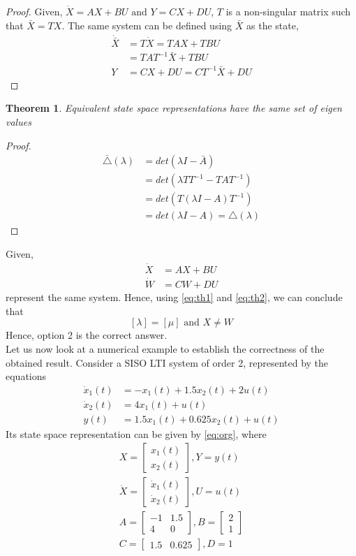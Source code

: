 \documentclass[journal,12pt,twocolumn]{IEEEtran}
\newtheorem{theorem}{Theorem}[section]
\begin{document}
\begin{proof}
Given, $\dot X=AX+BU \text{ and } Y=CX+DU$, $T$ is a non-singular matrix such that $\bar X= TX$. The same system can be defined using $\bar X$ as the state,
\begin{align}
    \dot{\bar X}&=T\dot X=TAX+TBU\\
    &=TAT^{-1}\bar X+TBU\\
    Y&=CX+DU=CT^{-1}\bar X+DU
\end{align}
\end{proof}
\begin{theorem}
Equivalent state space representations have the same set of eigen values
\label{eq:th2}
\end{theorem}
\begin{proof}
\begin{align}
    \bar\triangle(\lambda)&=det(\lambda I-\bar A)\\
    &=det(\lambda TT^{-1}-TAT^{-1})\\
    &=det(T(\lambda I-A)T^{-1})\\
    &=det(\lambda I-A)=\triangle(\lambda)
\end{align}
\end{proof}
Given,
\begin{align}
    \dot X&=AX+BU \\
    \dot W&=CW+DU
\end{align}
represent the same system. Hence, using \eqref{eq:th1} and \eqref{eq:th2}, we can conclude that
$$[\lambda]=[\mu] \text{ and } X\neq W$$
Hence, option 2 is the correct answer.\\
Let us now look at a numerical example to establish the correctness of the obtained result. Consider a SISO LTI system of order 2, represented by the equations
\begin{align}
    \dot x_1(t)&=-x_1(t)+1.5x_2(t)+2u(t)\\
    \dot x_2(t)&=4x_1(t)+u(t)\\
    y(t)&=1.5x_1(t)+0.625x_2(t)+u(t)
\end{align}
Its state space representation can be given by \eqref{eq:org}, where
\begin{align}
    X=\begin{bmatrix}
    x_1(t)\\x_2(t)
    \end{bmatrix},Y=y(t)\\
    \dot X=\begin{bmatrix}
    \dot x_1(t)\\\dot x_2(t)
    \end{bmatrix},U=u(t)\\
    A=\begin{bmatrix}
    -1 & 1.5\\
    4 & 0
    \end{bmatrix},B=\begin{bmatrix}
    2\\
    1
    \end{bmatrix}\\
    C=\begin{bmatrix}
    1.5 & 0.625
    \end{bmatrix},D=1
\end{align}
\end{document}
